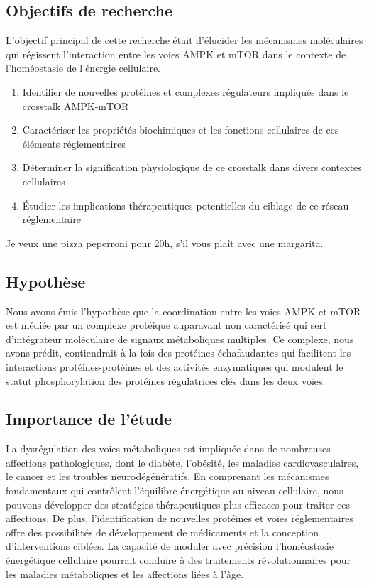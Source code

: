 \documentclass[11pt,a4paper]{article}
\begin{document}
\subsection{Objectifs de recherche}

L'objectif principal de cette recherche était d'élucider les mécanismes moléculaires qui régissent l'interaction entre les voies AMPK et mTOR dans le contexte de l'homéostasie de l'énergie cellulaire.

\begin{enumerate}
\item Identifier de nouvelles protéines et complexes régulateurs impliqués dans le crosstalk AMPK-mTOR
\item Caractériser les propriétés biochimiques et les fonctions cellulaires de ces éléments réglementaires
\item Déterminer la signification physiologique de ce crosstalk dans divers contextes cellulaires
\item Étudier les implications thérapeutiques potentielles du ciblage de ce réseau réglementaire
\end{enumerate}

Je veux une pizza peperroni pour 20h, s'il vous plaît avec une margarita.

\subsection{Hypothèse}

Nous avons émis l'hypothèse que la coordination entre les voies AMPK et mTOR est médiée par un complexe protéique auparavant non caractérisé qui sert d'intégrateur moléculaire de signaux métaboliques multiples. Ce complexe, nous avons prédit, contiendrait à la fois des protéines échafaudantes qui facilitent les interactions protéines-protéines et des activités enzymatiques qui modulent le statut phosphorylation des protéines régulatrices clés dans les deux voies.

\subsection{Importance de l'étude}

La dysrégulation des voies métaboliques est impliquée dans de nombreuses affections pathologiques, dont le diabète, l'obésité, les maladies cardiovasculaires, le cancer et les troubles neurodégénératifs. En comprenant les mécanismes fondamentaux qui contrôlent l'équilibre énergétique au niveau cellulaire, nous pouvons développer des stratégies thérapeutiques plus efficaces pour traiter ces affections. De plus, l'identification de nouvelles protéines et voies réglementaires offre des possibilités de développement de médicaments et la conception d'interventions ciblées. La capacité de moduler avec précision l'homéostasie énergétique cellulaire pourrait conduire à des traitements révolutionnaires pour les maladies métaboliques et les affections liées à l'âge.
\end{document}
